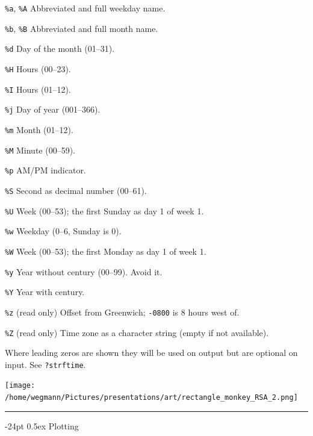 \documentclass[8pt,landscape]{article}
\makeatletter
\renewcommand\section{\@startsection{section}{1}{0mm}%
                                     {-24pt}%
                                     {0.5ex}%
                                {\color{blue}\normalfont\large\bfseries}}
\newcommand{\code}{\texttt}
\newcommand{\describe}[1]{\begin{description}{#1}\end{description}}
\makeatother
\begin{document}
\begin{multicols*}{3}
  \describe{
\itemsep=0pt\parskip=0pt
    \item{\code{\%a}, \code{\%A}} {Abbreviated and full weekday name.}
    \item{\code{\%b}, \code{\%B}} {Abbreviated and full month name.}
    \item{\code{\%d}} {Day of the month (01--31).}
    \item{\code{\%H}} {Hours (00--23).}
    \item{\code{\%I}} {Hours (01--12).}
    \item{\code{\%j}} {Day of year (001--366).}
    \item{\code{\%m}} {Month (01--12).}
    \item{\code{\%M}} {Minute (00--59).}
    \item{\code{\%p}} {AM/PM indicator. }
    \item{\code{\%S}} {Second as decimal number (00--61).}
    \item{\code{\%U}} {Week (00--53); the first Sunday as day 1 of week 1.}
    \item{\code{\%w}} {Weekday (0--6, Sunday is 0).}
    \item{\code{\%W}} {Week (00--53); the first Monday as day 1 of week 1.}
    \item{\code{\%y}} {Year without century (00--99). Avoid it.}
    \item{\code{\%Y}} {Year with century.}
    \item{\code{\%z}} {(read only) Offset from Greenwich; \code{-0800} 
        is 8 hours west of.}
    \item{\code{\%Z}} {(read only) Time zone as a character string 
        (empty if not available).}
  }

Where leading zeros are shown they will be used on output but are
optional on input. See \code{?strftime}.  


\bigskip

\begin{center}
 \texttt{[image: /home/wegmann/Pictures/presentations/art/rectangle\_monkey\_RSA\_2.png]}
\end{center}



\rule{.3\textwidth}{0.4pt}


\section{Plotting}


\end{multicols*}
\end{document}
